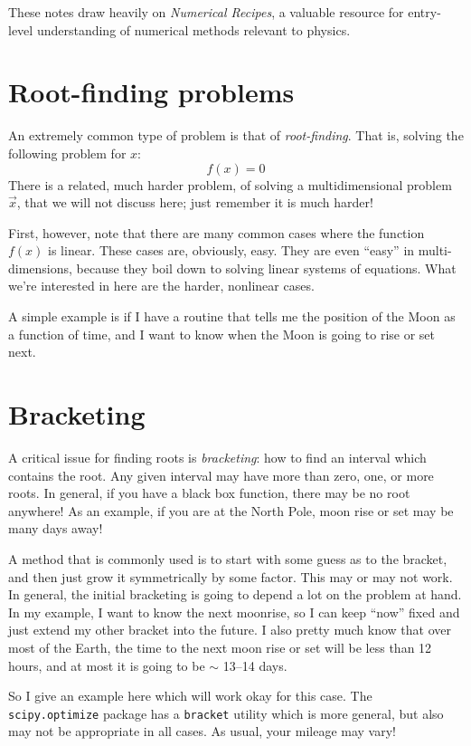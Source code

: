 These notes draw heavily on {\it Numerical Recipes}, a valuable
resource for entry-level understanding of numerical methods relevant
to physics.

\section{Root-finding problems}

An extremely common type of problem is that of {\it
  root-finding}. That is, solving the following problem for $x$:
\begin{equation}
f(x) = 0
\end{equation}
There is a related, much harder problem, of solving a multidimensional
problem $\vec{x}$, that we will not discuss here; just remember it is
much harder!

First, however, note that there are many common cases where the
function $f(x)$ is linear. These cases are, obviously, easy. They are
even ``easy'' in multi-dimensions, because they boil down to solving
linear systems of equations. What we're interested in here are the
harder, nonlinear cases.

A simple example is if I have a routine that tells me the position of
the Moon as a function of time, and I want to know when the Moon is
going to rise or set next. 

\section{Bracketing}

A critical issue for finding roots is {\it bracketing}: how to find an
interval which contains the root. Any given interval may have more
than zero, one, or more roots. In general, if you have a black box
function, there may be no root anywhere! As an example, if you are at
the North Pole, moon rise or set may be many days away!

A method that is commonly used is to start with some guess as to the
bracket, and then just grow it symmetrically by some factor. This may
or may not work. In general, the initial bracketing is going to depend
a lot on the problem at hand. In my example, I want to know the next
moonrise, so I can keep ``now'' fixed and just extend my other bracket
into the future. I also pretty much know that over most of the Earth,
the time to the next moon rise or set will be less than 12 hours, and
at most it is going to be $\sim$ 13--14 days.

So I give an example here which will work okay for this case. The {\tt
  scipy.optimize} package has a {\tt bracket} utility which is more
general, but also may not be appropriate in all cases. As usual, your
mileage may vary!

